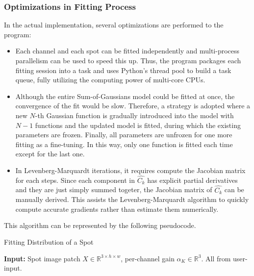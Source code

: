 \begin{spacing}{1.5}
\subsubsection{Optimizations in Fitting Process}
In the actual implementation, several optimizations are performed to the program:
\begin{itemize}
    \item Each channel and each spot can be fitted independently and multi-process parallelism can be used to speed this up. Thus, the program packages each fitting session into a task and uses Python's thread pool to build a task queue, fully utilizing the computing power of multi-core CPUs.  
    \item Although the entire Sum-of-Gaussians model could be fitted at once, the convergence of the fit would be slow. Therefore, a strategy is adopted where a new $N$-th Gaussian function is gradually introduced into the model with $N-1$ functions and the updated model is fitted, during which the existing parameters are frozen. Finally, all parameters are unfrozen for one more fitting as a fine-tuning. In this way, only one function is fitted each time except for the last one.
    \item In Levenberg-Marquardt iterations, it requires compute the Jacobian matrix for each steps. Since each component in $\hat{C_k}$ has explicit partial derivatives and they are just simply summed togeter, the Jacobian matrix of $\hat{C_k}$ can be manually derived. This assists the Levenberg-Marquardt algorithm to quickly compute accurate gradients rather than estimate them numerically.
\end{itemize}
This algorithm can be represented by the following pseudocode.
\begin{algorithm}
    \caption{Fitting Distribution of a Spot}
    \begin{algorithmic}[1]
    
    \State \textbf{Input:} Spot image patch $X\in\mathbb{R}^{3\times h \times w}$, per-channel gain $\alpha_K\in\mathbb{R}^3$. All from user-input.
    

\end{algorithmic}
\end{algorithm}
\end{spacing}

